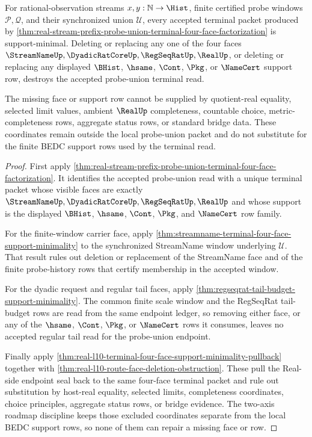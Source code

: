 \begin{theorem}
\label{thm:real-stream-prefix-probe-union-terminal-four-face-support-minimality}
For rational-observation streams $x,y:\mathbb{N}\to\Hist$, finite certified
probe windows $\mathcal P,\mathcal Q$, and their synchronized union
$\mathcal U$, every accepted terminal packet produced by
\autoref{thm:real-stream-prefix-probe-union-terminal-four-face-factorization}
is support-minimal. Deleting or replacing any one of the four faces
$\StreamNameUp,\DyadicRatCoreUp,\RegSeqRatUp,\RealUp$, or deleting or replacing
any displayed $\BHist$, $\hsame$, $\Cont$, $\Pkg$, or $\NameCert$ support row,
destroys the accepted probe-union terminal read.

The missing face or support row cannot be supplied by quotient-real equality,
selected limit values, ambient $\RealUp$ completeness, countable choice,
metric-completeness rows, aggregate status rows, or standard bridge data. These
coordinates remain outside the local probe-union packet and do not substitute
for the finite BEDC support rows used by the terminal read.
\end{theorem}
\begin{proof}
First apply
\autoref{thm:real-stream-prefix-probe-union-terminal-four-face-factorization}.
It identifies the accepted probe-union read with a unique terminal packet whose
visible faces are exactly
$\StreamNameUp,\DyadicRatCoreUp,\RegSeqRatUp,\RealUp$ and whose support is the
displayed $\BHist$, $\hsame$, $\Cont$, $\Pkg$, and $\NameCert$ row family.

For the finite-window carrier face, apply
\autoref{thm:streamname-terminal-four-face-support-minimality} to the
synchronized StreamName window underlying $\mathcal U$. That result rules out
deletion or replacement of the StreamName face and of the finite probe-history
rows that certify membership in the accepted window.

For the dyadic request and regular tail faces, apply
\autoref{thm:regseqrat-tail-budget-support-minimality}. The common finite scale
window and the RegSeqRat tail-budget rows are read from the same endpoint
ledger, so removing either face, or any of the $\hsame$, $\Cont$, $\Pkg$, or
$\NameCert$ rows it consumes, leaves no accepted regular tail read for the
probe-union endpoint.

Finally apply
\autoref{thm:real-l10-terminal-four-face-support-minimality-pullback} together
with \autoref{thm:real-l10-route-face-deletion-obstruction}. These pull the
Real-side endpoint seal back to the same four-face terminal packet and rule out
substitution by host-real equality, selected limits, completeness coordinates,
choice principles, aggregate status rows, or bridge evidence. The two-axis
roadmap discipline keeps those excluded coordinates separate from the local
BEDC support rows, so none of them can repair a missing face or row.
\end{proof}

